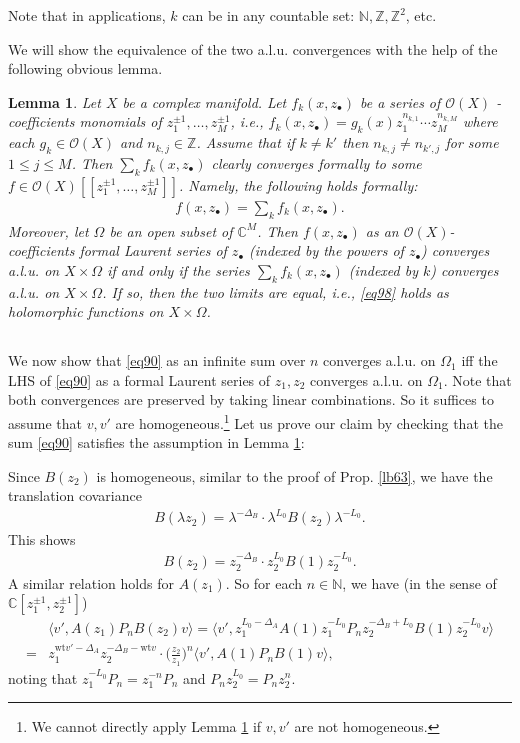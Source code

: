 \documentclass[12pt,a4paper,notitlepage]{article}
\theoremstyle{definition}
\theoremstyle{plain}
\newtheorem{lm}[df]{Lemma}
\newcommand{\bk}[1]{\langle {#1}\rangle}
\newcommand{\bigbk}[1]{\big\langle {#1}\big\rangle}
\newcommand{\scr}{\mathscr}
\newcommand{\blt}{\bullet}
\newcommand{\Cbb}{\mathbb C}
\newcommand{\Nbb}{\mathbb N}
\newcommand{\Zbb}{\mathbb Z}
\newcommand{\wt}{\mathrm{wt}}
\numberwithin{equation}{section}
\begin{document}
Note that in applications, $k$ can be in any countable set: $\Nbb,\Zbb,\Zbb^2$, etc.

We will show the equivalence of the two a.l.u. convergences with the help of the following obvious lemma.

\begin{lm}\label{lb65}
Let $X$ be a complex manifold. Let $f_k(x,z_\blt)$ be a series of $\scr O(X)$ -coefficients monomials of $z_1^{\pm1},\dots,z_M^{\pm1}$, i.e.,   $f_k(x,z_\blt)=g_k(x)z_1^{n_{k,1}}\cdots z_M^{n_{k,M}}$ where each $g_k\in\scr O(X)$ and $n_{k,j}\in\Zbb$. Assume that if $k\neq k'$ then $n_{k,j}\neq n_{k',j}$ for some $1\leq j\leq M$. Then $\sum_k f_k(x,z_\blt)$ clearly converges formally to some $f\in\scr O(X)[[z_1^{\pm1},\dots,z_M^{\pm1}]]$.  Namely, the following holds formally:
\begin{align}
f(x,z_\blt)=\sum_k f_k(x,z_\blt).\label{eq98}
\end{align}
Moreover, let $\Omega$ be an open subset of $\Cbb^M$. Then $f(x,z_\blt)$ as an $\scr O(X)$-coefficients formal Laurent series of $z_\blt$ (indexed by the powers of $z_\blt$) converges a.l.u. on $X\times\Omega$ if and only if the series $\sum_k f_k(x,z_\blt)$ (indexed by $k$) converges a.l.u. on $X\times\Omega$. If so, then the two limits are equal, i.e., \eqref{eq98} holds as holomorphic functions on $X\times\Omega$.
\end{lm}



\subsection{}\label{lb184}

We now show that \eqref{eq90} as an infinite sum over $n$ converges a.l.u. on $\Omega_1$ iff the LHS of \eqref{eq90} as a formal Laurent series of $z_1,z_2$ converges a.l.u. on $\Omega_1$. Note that both convergences are preserved by taking linear combinations. So it suffices to assume that $v,v'$ are homogeneous.\footnote{We cannot directly apply Lemma \ref{lb65} if $v,v'$ are not homogeneous.} Let us prove our claim by checking that  the sum \eqref{eq90} satisfies the assumption in Lemma \ref{lb65}:

Since $B(z_2)$ is homogeneous, similar to the proof of Prop. \ref{lb63}, we have the translation covariance
\begin{align}
	B(\lambda z_2)=\lambda^{-\Delta_B}\cdot\lambda^{L_0}B(z_2)\lambda^{-L_0}.\label{eq103}	
\end{align}
This shows
\begin{align}
B(z_2)=z_2^{-\Delta_B}\cdot z_2^{L_0}B(1)z_2^{-L_0}.\label{eq117}	
\end{align}
A similar relation holds for $A(z_1)$. So for each $n\in\Nbb$, we have (in the sense of  $\Cbb[z_1^{\pm1},z_2^{\pm1}]$)
\begin{align}
	&\bk{v',A(z_1)P_nB(z_2)v}=	\bk{v',z_1^{L_0-\Delta_A}A(1)z_1^{-L_0}P_nz_2^{-\Delta_B+L_0}B(1)z_2^{-L_0}v}\nonumber\\
	=&z_1^{\wt v'-\Delta_A}z_2^{-\Delta_B-\wt v}\cdot \big(\frac{z_2}{z_1}\big)^n\bigbk{v',A(1)P_nB(1)v},\label{eq97}
\end{align}
noting that $z_1^{-L_0}P_n=z_1^{-n}P_n$ and $P_nz_2^{L_0}=P_nz_2^n$. 
\end{document}
